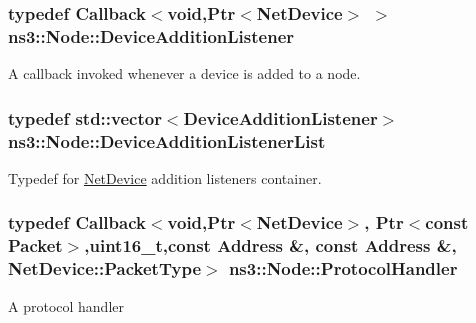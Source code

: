 \subsubsection[{\texorpdfstring{Device\+Addition\+Listener}{DeviceAdditionListener}}]{\setlength{\rightskip}{0pt plus 5cm}typedef {\bf Callback}$<$void,{\bf Ptr}$<${\bf Net\+Device}$>$ $>$ {\bf ns3\+::\+Node\+::\+Device\+Addition\+Listener}}\hypertarget{classns3_1_1Node_a29fd546b16195fd0ac8848ee107b5bc0}{}\label{classns3_1_1Node_a29fd546b16195fd0ac8848ee107b5bc0}
A callback invoked whenever a device is added to a node. 
\subsubsection[{\texorpdfstring{Device\+Addition\+Listener\+List}{DeviceAdditionListenerList}}]{\setlength{\rightskip}{0pt plus 5cm}typedef std\+::vector$<${\bf Device\+Addition\+Listener}$>$ {\bf ns3\+::\+Node\+::\+Device\+Addition\+Listener\+List}\hspace{0.3cm}{\ttfamily [private]}}\hypertarget{classns3_1_1Node_a0c4d3ac6f525874c6d1bbde6d086193a}{}\label{classns3_1_1Node_a0c4d3ac6f525874c6d1bbde6d086193a}


Typedef for \hyperlink{classns3_1_1NetDevice}{Net\+Device} addition listeners container. 

\subsubsection[{\texorpdfstring{Protocol\+Handler}{ProtocolHandler}}]{\setlength{\rightskip}{0pt plus 5cm}typedef {\bf Callback}$<$void,{\bf Ptr}$<${\bf Net\+Device}$>$, {\bf Ptr}$<$const {\bf Packet}$>$,uint16\+\_\+t,const {\bf Address} \&, const {\bf Address} \&, {\bf Net\+Device\+::\+Packet\+Type}$>$ {\bf ns3\+::\+Node\+::\+Protocol\+Handler}}\hypertarget{classns3_1_1Node_a4ce20b9442f89703d242ce3a3fa3dbf2}{}\label{classns3_1_1Node_a4ce20b9442f89703d242ce3a3fa3dbf2}
A protocol handler


